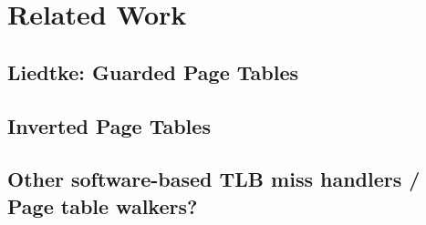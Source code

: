 \chapter{Related Work}

\label{chap:related}

\section{Liedtke: Guarded Page Tables}
\section{Inverted Page Tables}

\section{Other software-based TLB miss handlers / Page table walkers?}
